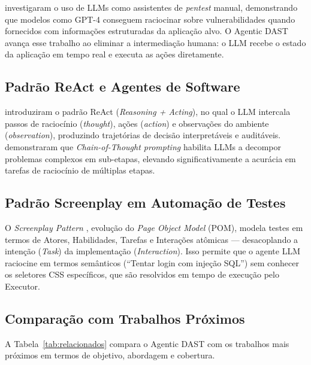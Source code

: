 \documentclass[
    10pt,
    twocolumn,
    a4paper
]{article}
\begin{document}
 investigaram o uso de LLMs como assistentes
de \textit{pentest} manual, demonstrando que modelos como GPT-4 conseguem
raciocinar sobre vulnerabilidades quando fornecidos com informações
estruturadas da aplicação alvo. O Agentic DAST avança esse trabalho ao
eliminar a intermediação humana: o LLM recebe o estado da aplicação em
tempo real e executa as ações diretamente.

\subsection{Padrão ReAct e Agentes de Software}

 introduziram o padrão ReAct
(\textit{Reasoning + Acting}), no qual o LLM intercala passos de
raciocínio (\textit{thought}), ações (\textit{action}) e observações
do ambiente (\textit{observation}), produzindo trajetórias de decisão
interpretáveis e auditáveis.  demonstraram que
\textit{Chain-of-Thought prompting} habilita LLMs a decompor problemas
complexos em sub-etapas, elevando significativamente a acurácia em
tarefas de raciocínio de múltiplas etapas.

\subsection{Padrão Screenplay em Automação de Testes}

O \textit{Screenplay Pattern} \cite{serenityscreenplay}, evolução do
\textit{Page Object Model} (POM), modela testes em termos de Atores,
Habilidades, Tarefas e Interações atômicas --- desacoplando a intenção
(\textit{Task}) da implementação (\textit{Interaction}). Isso permite
que o agente LLM raciocine em termos semânticos (``Tentar login com
injeção SQL'') sem conhecer os seletores CSS específicos, que são
resolvidos em tempo de execução pelo Executor.

\subsection{Comparação com Trabalhos Próximos}

A Tabela~\ref{tab:relacionados} compara o Agentic DAST com os trabalhos
mais próximos em termos de objetivo, abordagem e cobertura.
\end{document}

